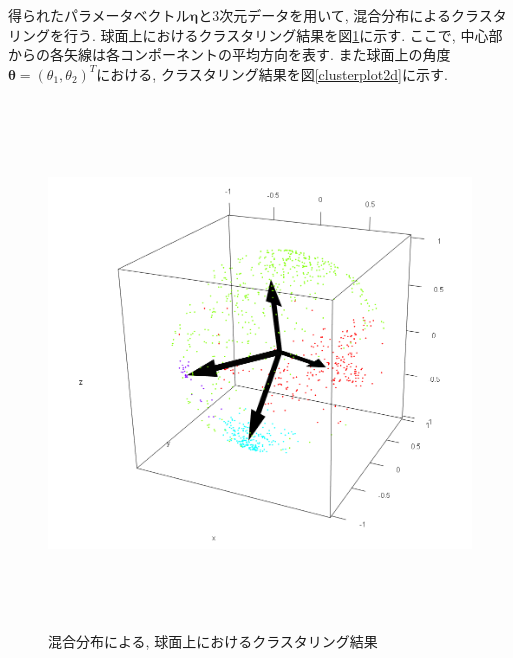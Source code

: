 \documentclass[a4j,12pt]{jarticle}
\begin{document}
得られたパラメータベクトル$\bm \eta$と$3$次元データを用いて, 混合分布によるクラスタリングを行う. 球面上におけるクラスタリング結果を図\ref{clusterplot3d}に示す. ここで, 中心部からの各矢線は各コンポーネントの平均方向を表す. また球面上の角度$\bm \theta = (\theta_1, \theta_2)^T$における, クラスタリング結果を図\ref{clusterplot2d}に示す.

\newpage %
\begin{figure}[tbp]
\begin{center}
\includegraphics[clip,height= 140mm]{data/cluster_3d.png}
\end{center}
\caption{混合分布による, 球面上におけるクラスタリング結果}
\label{clusterplot3d}
\end{figure}
\end{document}
